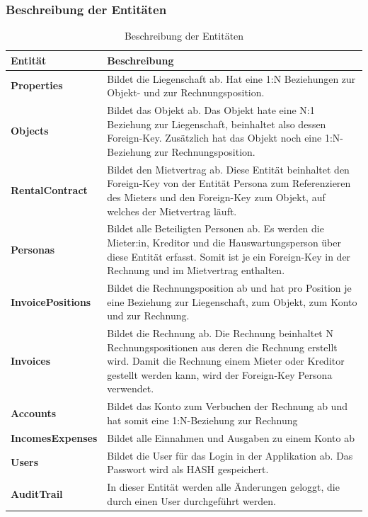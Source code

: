 \subsubsection{Beschreibung der Entitäten}
\begin{table}[H]
  \centering
  \settowidth{}
  \setlength\extrarowheight{2pt}
    \begin{tabulary}{1.0\textwidth}{|L|m{15cm}|}
      \hline
      \textbf{Entität}& \textbf{Beschreibung}\\
    \hline
    \textbf{Properties} & Bildet die Liegenschaft ab. Hat eine 1:N Beziehungen zur Objekt- und zur Rechnungsposition.\\
    \hline
    \textbf{Objects} & Bildet das Objekt ab. Das Objekt hate eine N:1 Beziehung zur Liegenschaft, beinhaltet also dessen Foreign-Key. Zusätzlich hat das Objekt noch eine 1:N-Beziehung zur Rechnungsposition.\\
    \hline
    \textbf{RentalContract} & Bildet den Mietvertrag ab. Diese Entität beinhaltet den Foreign-Key von der Entität Persona zum Referenzieren des Mieters und den Foreign-Key zum Objekt, auf welches der Mietvertrag läuft. \\
    \hline
    \textbf{Personas} & Bildet alle Beteiligten Personen ab. Es werden die Mieter:in, Kreditor und die Hauswartungsperson über diese Entität erfasst. Somit ist je ein Foreign-Key in der Rechnung und im Mietvertrag enthalten. \\
    \hline
    \textbf{InvoicePositions} & Bildet die Rechnungsposition ab und hat pro Position je eine Beziehung zur Liegenschaft, zum Objekt, zum Konto und zur Rechnung.\\
    \hline
    \textbf{Invoices} & Bildet die Rechnung ab. Die Rechnung beinhaltet N Rechnungspositionen aus deren die Rechnung erstellt wird. Damit die Rechnung einem Mieter oder Kreditor gestellt werden kann, wird der Foreign-Key Persona verwendet.\\
    \hline
    \textbf{Accounts} & Bildet das Konto zum Verbuchen der Rechnung ab und hat somit eine 1:N-Beziehung zur Rechnung\\
    \hline
    \textbf{IncomesExpenses} & Bildet alle Einnahmen und Ausgaben zu einem Konto ab\\
    \hline
    \textbf{Users} & Bildet die User für das Login in der Applikation ab. Das Passwort wird als HASH gespeichert.\\
    \hline 
    \textbf{AuditTrail} & In dieser Entität werden alle Änderungen geloggt, die durch einen User durchgeführt werden.\\
    \hline 
\end{tabulary}
\caption{Beschreibung der Entitäten}
\end{table}

